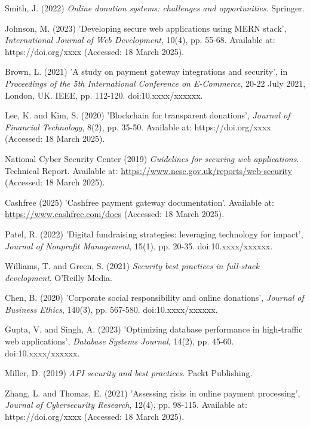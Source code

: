\begin{thebibliography}{99}

 Smith, J. (2022) \textit{Online donation systems: challenges and opportunities}. Springer.

 Johnson, M. (2023) 'Developing secure web applications using MERN stack', \textit{International Journal of Web Development}, 10(4), pp. 55-68. Available at: https://doi.org/xxxx (Accessed: 18 March 2025).

 Brown, L. (2021) 'A study on payment gateway integrations and security', in \textit{Proceedings of the 5th International Conference on E-Commerce}, 20-22 July 2021, London, UK. IEEE, pp. 112-120. doi:10.xxxx/xxxxxx.

 Lee, K. and Kim, S. (2020) 'Blockchain for transparent donations', \textit{Journal of Financial Technology}, 8(2), pp. 35-50. Available at: https://doi.org/xxxx (Accessed: 18 March 2025).

 National Cyber Security Center (2019) \textit{Guidelines for securing web applications}. Technical Report. Available at: \url{https://www.ncsc.gov.uk/reports/web-security} (Accessed: 18 March 2025).

 Cashfree (2025) 'Cashfree payment gateway documentation'. Available at: \url{https://www.cashfree.com/docs} (Accessed: 18 March 2025).

 Patel, R. (2022) 'Digital fundraising strategies: leveraging technology for impact', \textit{Journal of Nonprofit Management}, 15(1), pp. 20-35. doi:10.xxxx/xxxxxx.

 Williams, T. and Green, S. (2021) \textit{Security best practices in full-stack development}. O'Reilly Media.

 Chen, B. (2020) 'Corporate social responsibility and online donations', \textit{Journal of Business Ethics}, 140(3), pp. 567-580. doi:10.xxxx/xxxxxx.

 Gupta, V. and Singh, A. (2023) 'Optimizing database performance in high-traffic web applications', \textit{Database Systems Journal}, 14(2), pp. 45-60. doi:10.xxxx/xxxxxx.

 Miller, D. (2019) \textit{API security and best practices}. Packt Publishing.

 Zhang, L. and Thomas, E. (2021) 'Assessing risks in online payment processing', \textit{Journal of Cybersecurity Research}, 12(4), pp. 98-115. Available at: https://doi.org/xxxx (Accessed: 18 March 2025).


\end{thebibliography}
